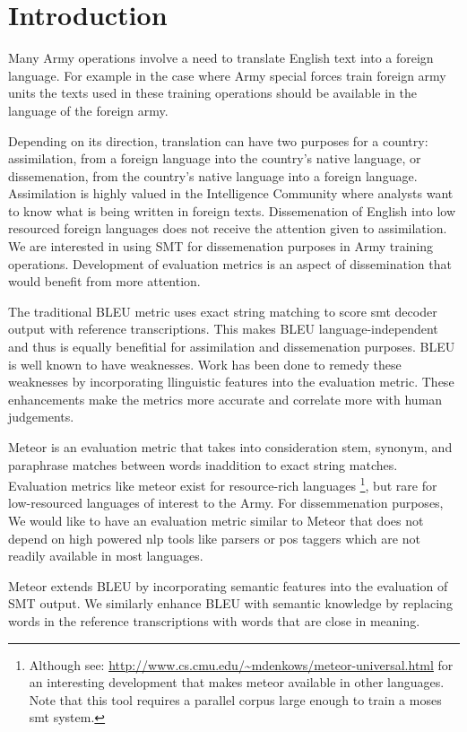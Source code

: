 \section{Introduction}
\label{sec:intro}

Many Army operations involve a need to translate English text into a
foreign language. For example in the case where Army special forces
train foreign army units the texts used in these training operations
should be available in the language of the foreign army.

Depending on its direction, translation can have two purposes for a
country: assimilation, from a foreign language into the country's
native language, or dissemenation, from the country's native language
into a foreign language. Assimilation is highly valued in the
Intelligence Community where analysts want to know what is being
written in foreign texts. Dissemenation of English into low resourced
foreign languages does not receive the attention given to
assimilation. We are interested in using SMT for
dissemenation purposes in Army training operations. Development of
evaluation metrics is an aspect of dissemination that would benefit
from more attention.

The traditional BLEU\cite{BLEU} metric uses exact string matching to score smt
decoder output with reference transcriptions. This makes BLEU
language-independent and thus is equally benefitial for assimilation
and dissemenation purposes. BLEU is well known to have
weaknesses\cite{Callison-Burch2006EACL}. Work has been done to remedy these weaknesses by
incorporating llinguistic features into the evaluation metric. These
enhancements make the metrics more accurate and correlate more with
human judgements.

Meteor\cite{banerjee-lavie2005MTSumm} is an evaluation metric that takes into consideration stem, synonym, and paraphrase matches between words inaddition to exact string matches. Evaluation metrics like meteor exist for resource-rich languages \footnote{Although see: \url{http://www.cs.cmu.edu/~mdenkows/meteor-universal.html} for an interesting development that makes meteor available in other languages. Note that this tool  requires a parallel corpus large enough to train a moses smt system.}, but rare for low-resourced languages of interest to the Army. For dissemmenation purposes, We would like to have an evaluation metric similar to Meteor that does not depend on high powered nlp tools like parsers or pos taggers which are not readily available in most languages.

Meteor extends BLEU by incorporating semantic features into the evaluation of SMT output. We similarly enhance BLEU with semantic knowledge by replacing words in the reference transcriptions with words that are close in meaning. 

